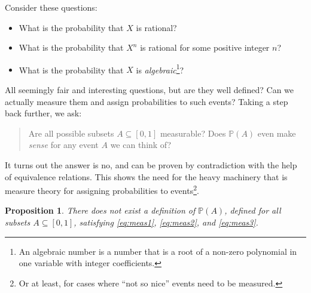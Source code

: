 \documentclass[
]{book}
\providecommand{\tightlist}{%
  \setlength{\itemsep}{0pt}\setlength{\parskip}{0pt}}
\newcommand{\bbP}{\mathbb{P}}
\newtheorem{proposition}{Proposition}[chapter]
\theoremstyle{definition}
\theoremstyle{definition}
\theoremstyle{definition}
\theoremstyle{definition}
\theoremstyle{remark}
\begin{document}
Consider these questions:

\begin{itemize}
\tightlist
\item
  What is the probability that \(X\) is rational?
\item
  What is the probability that \(X^n\) is rational for some positive integer \(n\)?
\item
  What is the probability that \(X\) is \emph{algebraic}\footnote{An algebraic number is a number that is a root of a non-zero polynomial in one variable with integer coefficients.}?
\end{itemize}

All seemingly fair and interesting questions, but are they well defined? Can we actually measure them and assign probabilities to such events? Taking a step back further, we ask:

\begin{quote}
Are all possible subsets \(A\subseteq [0,1]\) measurable? Does \(\bbP(A)\) even make \emph{sense} for any event \(A\) we can think of?
\end{quote}

It turns out the answer is no, and can be proven by contradiction with the help of equivalence relations.
This shows the need for the heavy machinery that is measure theory for assigning probabilities to events\footnote{Or at least, for cases where ``not so nice'' events need to be measured.}.

\begin{proposition}
There does not exist a definition of \(\bbP(A)\), defined for all subsets \(A\subseteq[0,1]\), satisfying \eqref{eq:meas1}, \eqref{eq:meas2}, and \eqref{eq:meas3}.
\end{proposition}
\end{document}
